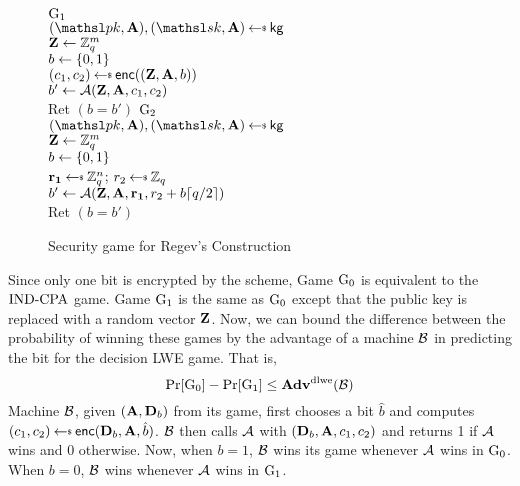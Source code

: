\begin{figure}[h]
\centering
{}
{
    \underline{${{\textnormal G}}_1$}\\[1pt]
    $(\pk,\varvect{A}),(\sk, \varvect{A}) \getsr \kg$\\
    $\mathbf{Z} \gets {{\mathbb Z}}_q^m$\\
    $b \gets \{0,1\}$\\
    $(c_1, c_2) \getsr \enc((\varvect{Z}, \varvect{A}, b))$\\
    $b' \gets {\mathcal A}(\mathbf{Z}, \mathbf{A}, c_1, c_2)$\\
    Ret $(b = b')$
}
{
    \underline{${{\textnormal G}}_2$}\\[1pt]
    $(\pk,\varvect{A}),(\sk, \varvect{A}) \getsr \kg$\\
    $\mathbf{Z} \gets {{\mathbb Z}}_q^m$\\
    $b \gets \{0,1\}$\\
    $\varvect{r_1} \getsr \Z_q^n$; $r_2 \getsr \Z_q$\\
    $b' \gets {\mathcal A}(\mathbf{Z}, \mathbf{A}, \mathbf{r_1}, r_2 + b \lceil q/2 \rceil)$\\
    Ret $(b = b')$
}
\caption{Security game for Regev's Construction}
\label{fig: Security Regev}
\end{figure}

\noindent Since only one bit is encrypted by the scheme, Game ${{\textnormal G}}_0$ is equivalent to the $\textnormal{IND-CPA}$ game. Game ${{\textnormal G}}_1$ is the same as ${{\textnormal G}}_0$ except that the public key is replaced with a random vector $\mathbf{Z}$. Now, we can bound the difference between the probability of winning these games by the advantage of a machine ${\mathcal B}$ in predicting the bit for the decision LWE game. That is,
\[
    \Pr[{{\textnormal G}}_0] - \Pr[{{\textnormal G}}_1] \leq \mathbf{Adv}^{\textnormal{dlwe}}({\mathcal B})
\]
Machine ${\mathcal B}$, given $(\mathbf{A}, \mathbf{D}_b)$ from its game, first chooses a bit $\hat{b}$ and computes $(c_1, c_2) \getsr \enc(\varvect{D}_b, \varvect{A}, \hat{b})$. ${\mathcal B}$ then calls ${\mathcal A}$ with $(\mathbf{D}_b, \mathbf{A}, c_1, c_2)$ and returns 1 if ${\mathcal A}$ wins and 0 otherwise. Now, when $b = 1$, ${\mathcal B}$ wins its game whenever ${\mathcal A}$ wins in ${{\textnormal G}}_0$. When $b = 0$, ${\mathcal B}$ wins whenever ${\mathcal A}$ wins in ${{\textnormal G}}_1$.\\

